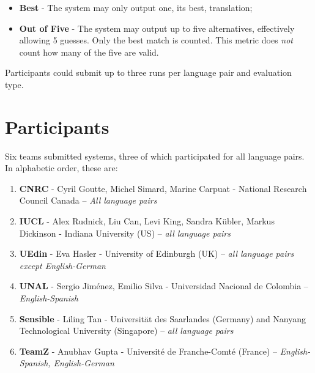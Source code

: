 \begin{itemize}
     \item \textbf{Best} - The system may only output one, its best, translation;
     \item \textbf{Out of Five} - The system may output up to five alternatives, effectively allowing 5 guesses. Only the best match is counted. This metric does \emph{not} count how many of the five are valid.
\end{itemize}     

Participants could submit up to three runs per language pair and evaluation type.

\section{Participants}

Six teams submitted systems, three of which participated for all language pairs. In alphabetic order, these are:

\begin{enumerate}
\item \textbf{CNRC} - Cyril Goutte, Michel Simard, Marine Carpuat - National Research Council Canada -- \emph{All language pairs}
\item \textbf{IUCL} - Alex Rudnick, Liu Can, Levi King, Sandra Kübler, Markus Dickinson - Indiana University (US) -- \emph{all language pairs}
\item \textbf{UEdin} - Eva Hasler - University of Edinburgh (UK) -- \emph{all language pairs except English-German}
\item \textbf{UNAL} - Sergio Jiménez, Emilio Silva - Universidad Nacional de Colombia -- \emph{English-Spanish}
\item \textbf{Sensible} - Liling Tan - Universität des Saarlandes (Germany) and Nanyang Technological University (Singapore) -- \emph{all language pairs}
\item \textbf{TeamZ} - Anubhav Gupta - Université de Franche-Comté (France) -- \emph{English-Spanish, English-German}
\end{enumerate}


